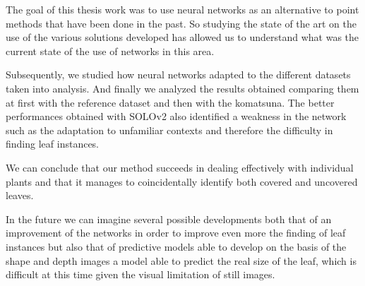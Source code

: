 


The goal of this thesis work was to use neural networks as an alternative to point methods that have been done in the past. So studying the state of the art on the use
of the various solutions developed has allowed us to understand what was the current state of the use of networks in this area.

Subsequently, we studied how neural networks adapted to the different datasets taken into analysis. And finally we analyzed the results obtained comparing them at first
with the reference dataset and then with the komatsuna. The better performances obtained with SOLOv2 also identified a weakness in the network such as the adaptation
to unfamiliar contexts and therefore the difficulty in finding leaf instances.

We can conclude that our method succeeds in dealing effectively with individual plants and that it manages to coincidentally identify both covered and uncovered leaves. 

In the future we can imagine several possible developments both that of an improvement of the networks in order to improve even more the finding of leaf instances but
also that of predictive models able to develop on the basis of the shape and depth images a model able to predict the real size of the leaf, which is difficult at this
time given the visual limitation of still images.



